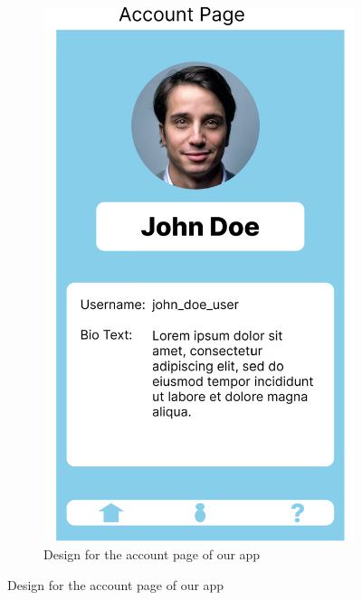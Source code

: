 \begin{figure}
\begin{subfigure}[T]{0.4\linewidth}
		\includegraphics[width=\linewidth]{figures/account.png}
		\caption{Design for the account page of our app}
		\label{fig:account}
	\end{subfigure}
\end{figure}

